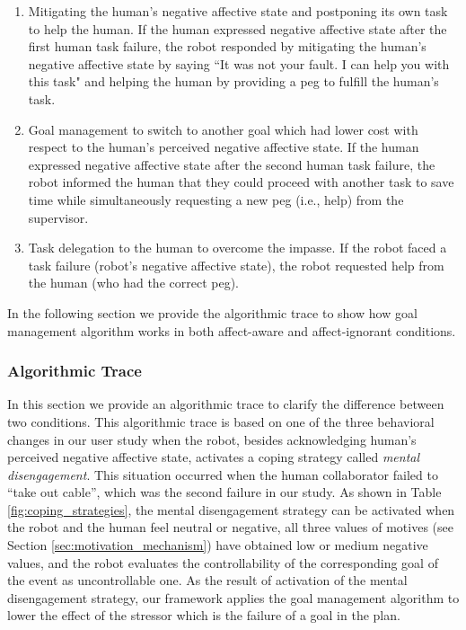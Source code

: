 \documentclass[12pt]{report}
\begin{document}
\begin{enumerate}
  \setlength\itemsep{-3mm}
  \item Mitigating the human's negative affective state and postponing its own
  task to help the human. If the human expressed negative affective state after
  the first human task failure, the robot responded by mitigating the human's
  negative affective state by saying ``It was not your fault. I can help you
  with this task" and helping the human by providing a peg to fulfill the
  human's task.
  \item Goal management to switch to another goal which had lower cost with
  respect to the human's perceived negative affective state. If the human
  expressed negative affective state after the second human task failure, the
  robot informed the human that they could proceed with another task to save
  time while simultaneously requesting a new peg (i.e., help) from the
  supervisor.
  \item Task delegation to the human to overcome the impasse. If the robot faced
  a task failure (robot's negative affective state), the robot requested help
  from the human (who had the correct peg).
\end{enumerate}

In the following section we provide the algorithmic trace to show how goal
management algorithm works in both affect-aware and affect-ignorant conditions.

\subsubsection{Algorithmic Trace}
In this section we provide an algorithmic trace to clarify the difference
between two conditions. This algorithmic trace is based on one of the three
behavioral changes in our user study when the robot, besides acknowledging
human's perceived negative affective state, activates a coping strategy called
\textit{mental disengagement}. This situation occurred when the human
collaborator failed to ``take out cable'', which was the second failure in our
study. As shown in Table \ref{fig:coping_strategies}, the mental disengagement
strategy can be activated when the robot and the human feel neutral or negative,
all three values of motives (see Section \ref{sec:motivation_mechanism}) have
obtained low or medium negative values, and the robot evaluates the
controllability of the corresponding goal of the event as uncontrollable one. As
the result of activation of the mental disengagement strategy, our framework
applies the goal management algorithm to lower the effect of the stressor which
is the failure of a goal in the plan.
\end{document}
